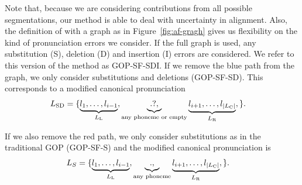 


Note that, because we are considering contributions from all possible segmentations, our method is able to deal with uncertainty in alignment.
Also, the definition of \Lsdi with a graph as in Figure~\ref{fig:af-gragh} gives us flexibility on the kind of pronunciation errors we consider.
If the full graph is used, any substitution (S), deletion (D) and insertion (I) errors are considered.
We refer to this version of the method as GOP-SF-SDI.
If we remove the blue path from the graph, we only consider substitutions and deletions (GOP-SF-SD).
This corresponds to a modified canonical pronunciation
\begin{align*}
 L_{\text{SD}} &= 
 \{
 \underbrace{l_1, \dots, l_{i-1}}_{L_{\text{L}}}, 
 \underbrace{.?,}_{\text{any phoneme or empty}} 
 \underbrace{l_{i+1}, \dots, l_{|L_{\text{C}}|}}_{L_{\text{R}}},
 \}.
\end{align*}

If we also remove the red path, we only consider substitutions as in the traditional GOP (GOP-SF-S) and the modified canonical pronunciation is
\begin{align*}
 L_S &= 
 \{
 \underbrace{l_1, \dots, l_{i-1}}_{L_{\text{L}}}, 
 \underbrace{.,}_{\text{any phoneme}} 
 \underbrace{l_{i+1}, \dots, l_{|L_{\text{C}}|}}_{L_{\text{R}}},
 \}.
\end{align*}

